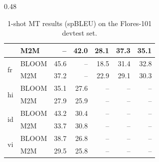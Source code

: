 \begin{table}[!ht]
\begin{subtable}[b]{0.48\textwidth}
{\begin{tabular}{llrrrrr}
 & M2M & -- & 42.0 & 28.1 & 37.3 & 35.1 \\
\midrule
\multirow{2}{*}{fr} & BLOOM & 45.6 & -- & 18.5 & 31.4 & 32.8 \\
 & M2M & 37.2 & -- & 22.9 & 29.1 & 30.3 \\
\midrule
\multirow{2}{*}{hi} & BLOOM & 35.1 & 27.6 & -- & -- & -- \\
 & M2M & 27.9 & 25.9 & -- & -- & -- \\
\midrule
\multirow{2}{*}{id} & BLOOM & 43.2 & 30.4 & -- & -- & -- \\
 & M2M & 33.7 & 30.8 & -- & -- & -- \\
\midrule
\multirow{2}{*}{vi} & BLOOM & 38.7 & 26.8 & -- & -- & -- \\
 & M2M & 29.5 & 25.8 & -- & -- & -- \\
  \bottomrule
\end{tabular}}
\caption{High$\rightarrow$mid-resource language pairs.}
\label{tab:flores101:high-mid}
\end{subtable}
\caption{\label{tab:flores-results}1-shot MT results (spBLEU) on the Flores-101 devtest set. }
\end{table}